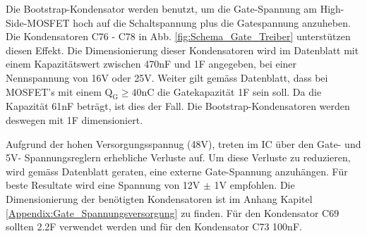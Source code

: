 

Die Bootstrap-Kondensator werden benutzt, um die Gate-Spannung am High-Side-MOSFET hoch auf die Schaltspannung plus die Gatespannung anzuheben. Die Kondensatoren C76 - C78 in Abb. \ref{fig:Schema_Gate_Treiber} unterstützen diesen Effekt.
Die Dimensionierung dieser Kondensatoren wird im Datenblatt mit einem Kapazitätswert zwischen 470nF und 1\textmugreek F angegeben, bei einer Nennspannung von 16V oder 25V. Weiter gilt gemäss Datenblatt, dass bei MOSFET's mit einem $\mathrm{Q_G \geq 40nC}$ die Gatekapazität 1\textmugreek F sein soll. Da die Kapazität 61nF beträgt, ist dies der Fall. Die Bootstrap-Kondensatoren werden deswegen mit 1\textmugreek F dimensioniert. \cite[S.10]{trinamicmotion_control_gmbh__co_kg_tmc6200_2019}



Aufgrund der hohen Versorgungsspannug (48V), treten im IC über den Gate- und 5V- Spannungsreglern erhebliche Verluste auf. Um diese Verluste zu reduzieren, wird gemäss Datenblatt \cite[S.11]{trinamicmotion_control_gmbh__co_kg_tmc6200_2019} geraten, eine externe Gate-Spannung anzuhängen. Für beste Resultate wird eine Spannung von 12V $\pm$ 1V empfohlen.
Die Dimensionierung der benötigten Kondensatoren ist im Anhang Kapitel \ref{Appendix:Gate_Spannungsversorgung} zu finden. Für den Kondensator C69 sollten 2.2\textmugreek F verwendet werden und für den Kondensator C73 100nF.


